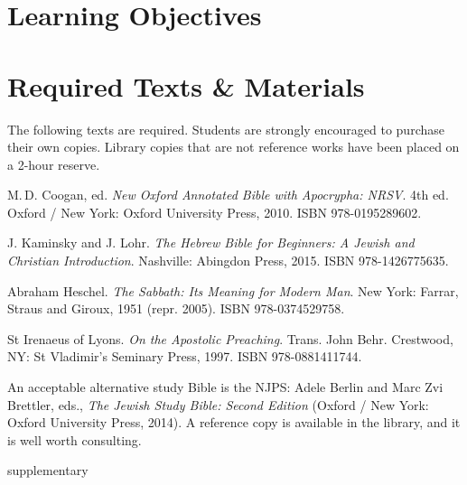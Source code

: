 \documentclass[titlepage]{article}
\newcommand\incl{../includes}
\begin{document}


  \section{Learning Objectives}
  \label{objectives}

  \edobject

\section{Required Texts \& Materials}
\label{texts}

The following texts are required. Students are strongly encouraged to
purchase their own copies. Library copies that are not reference works
have been placed on a 2-hour reserve.

\begingroup
\renewcommand{\section}[2]{}%
\begin{thebibliography}{Irenaeus}%

	 M.\,D. Coogan, ed.
    \emph{New Oxford Annotated Bible with Apocrypha: NRSV}. 4th ed.
    Oxford / New York: Oxford University Press, 2010.
    ISBN 978-0195289602.

	 J. Kaminsky and J. Lohr.
	\emph{The Hebrew Bible for Beginners: A Jewish and Christian Introduction}.
	Nashville: Abingdon Press, 2015.
	ISBN 978-1426775635.

	 Abraham Heschel.
	\emph{The Sabbath: Its Meaning for Modern Man}.
	New York: Farrar, Straus and Giroux, 1951 (repr. 2005).
	ISBN 978-0374529758.

	 St Irenaeus of Lyons.
	\emph{On the Apostolic Preaching}.
	Trans. John Behr.
	Crestwood, NY: St Vladimir’s Seminary Press, 1997.
	ISBN 978-0881411744.

\end{thebibliography}
\endgroup

An acceptable alternative study Bible is the NJPS: Adele Berlin and Marc
Zvi Brettler, eds., \emph{The Jewish Study Bible: Second Edition}
(Oxford / New York: Oxford University Press, 2014). A reference copy is
available in the library, and it is well worth consulting.

\section{Supplementary Texts}
\label{supplementary}
\end{document}
